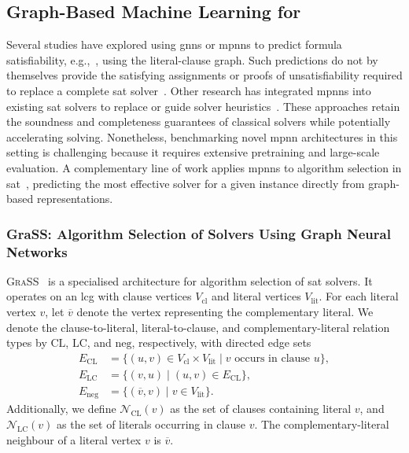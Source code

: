 \subsection{Graph-Based Machine Learning for }
\label{sec:ch07:gnn-sat}
Several studies have explored using \glspl{gnn} or \glspl{mpnn} to predict formula satisfiability, e.g.,~\citet{SelEtAl19}, using the literal-clause graph. Such predictions do not by themselves provide the satisfying assignments or proofs of unsatisfiability required to replace a complete \gls{sat} solver~\citep{SelEtAl19,LiEtAl24c}.  Other research has integrated \glspl{mpnn} into existing \gls{sat} solvers to replace or guide solver heuristics~\citep{WanEtAl24,TonGro25}. These approaches retain the soundness and completeness guarantees of classical solvers while potentially accelerating solving. Nonetheless, benchmarking novel \gls{mpnn} architectures in this setting is challenging because it requires extensive pretraining and large-scale evaluation.  A complementary line of work applies \glspl{mpnn} to algorithm selection in \gls{sat}~\citep{ZhaEtAl24b,Shavit23}, predicting the most effective solver for a given instance directly from graph-based representations.

\subsubsection{GraSS: Algorithm Selection of  Solvers Using Graph Neural Networks}
\label{sec:ch07:grass}
\textsc{GraSS}~\citep{ZhaEtAl24b} is a specialised architecture for algorithm selection of \gls{sat} solvers. It operates on an \gls{lcg} with clause vertices $V_{\mathrm{cl}}$ and literal vertices $V_{\mathrm{lit}}$. For each literal vertex $v$, let $\overline v$ denote the vertex representing the complementary literal. We denote the clause-to-literal, literal-to-clause, and complementary-literal relation types by $\mathrm{CL}$, $\mathrm{LC}$, and $\mathrm{neg}$, respectively, with directed edge sets
\begin{equation}
\label{eq:ch07:grass-relations}
\begin{aligned}
    E_{\mathrm{CL}}&=\{(u,v)\in V_{\mathrm{cl}}\times V_{\mathrm{lit}}\mid v\text{ occurs in clause }u\},\\
    E_{\mathrm{LC}}&=\{(v,u)\mid(u,v)\in E_{\mathrm{CL}}\},\\
    E_{\mathrm{neg}}&=\{(\overline v,v)\mid v\in V_{\mathrm{lit}}\}.
\end{aligned}
\end{equation}
Additionally, we define $\mathcal N_{\mathrm{CL}}(v)$ as the set of clauses containing literal $v$, and $\mathcal N_{\mathrm{LC}}(v)$ as the set of literals occurring in clause $v$. The complementary-literal neighbour of a literal vertex $v$ is $\overline v$.

